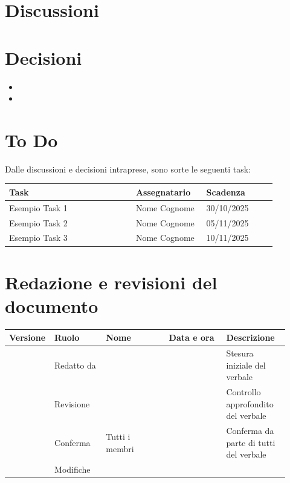 \documentclass[a4paper,12pt]{article}
\begin{document}
\section{Discussioni}

\section{Decisioni}
\begin{itemize}
    \item %
    \item %
\end{itemize}

\section{To Do}
Dalle discussioni e decisioni intraprese, sono sorte le seguenti task:

\begin{center}
\small
\renewcommand{\arraystretch}{1.2} 
\begin{tabular}{|p{0.45\linewidth}|p{0.25\linewidth}|p{0.25\linewidth}|}
\hline
\rowcolor{gray!60} 
\textbf{Task} & \textbf{Assegnatario} & \textbf{Scadenza} \\
\hline
\rowcolor{white}
Esempio Task 1 & Nome Cognome & 30/10/2025 \\
\hline
\rowcolor{gray!20}
Esempio Task 2 & Nome Cognome & 05/11/2025 \\
\hline
\rowcolor{white}
Esempio Task 3 & Nome Cognome & 10/11/2025 \\
\hline
\end{tabular}
\end{center}

\clearpage
\section{Redazione e revisioni del documento}

\begin{center}
\small
\renewcommand{\arraystretch}{1.2} 
\begin{tabular}{|p{0.1\linewidth}|p{0.18\linewidth}|p{0.22\linewidth}|p{0.20\linewidth}|p{0.22\linewidth}|}
\hline
\rowcolor{gray!60} 
\textbf{Versione} & \textbf{Ruolo} & \textbf{Nome} & \textbf{Data e ora} & \textbf{Descrizione} \\
\hline
\rowcolor{white}
 & Redatto da &  &  & Stesura iniziale del verbale \\
\hline
\rowcolor{gray!20}
 & Revisione &  &  & Controllo approfondito del verbale \\
\hline
\rowcolor{white}
 & Conferma & Tutti i membri &  & Conferma da parte di tutti del verbale \\
\hline
\rowcolor{gray!20}
 & Modifiche &  &  &  \\
\hline
\end{tabular}
\end{center}
\end{document}
